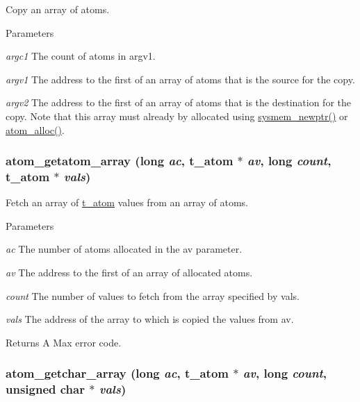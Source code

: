 Copy an array of atoms. 
\begin{DoxyParams}{Parameters}
\item[{\em argc1}]The count of atoms in argv1. \item[{\em argv1}]The address to the first of an array of atoms that is the source for the copy. \item[{\em argv2}]The address to the first of an array of atoms that is the destination for the copy. Note that this array must already by allocated using \hyperlink{group__memory_ga276676be214edff9fe5c9d0681f39ae6}{sysmem\_\-newptr()} or \hyperlink{group__atom_gad1a3b8eed4c311ec41b2d565bf40b002}{atom\_\-alloc()}. \end{DoxyParams}
\hypertarget{group__atom_ga76191e30761d55e4528b50e447f43abb}{
\subsubsection[{atom\_\-getatom\_\-array}]{ atom\_\-getatom\_\-array (long {\em ac}, \/  {\bf t\_\-atom} $\ast$ {\em av}, \/  long {\em count}, \/  {\bf t\_\-atom} $\ast$ {\em vals})}}
\label{group__atom_ga76191e30761d55e4528b50e447f43abb}


Fetch an array of \hyperlink{structt__atom}{t\_\-atom} values from an array of atoms. 
\begin{DoxyParams}{Parameters}
\item[{\em ac}]The number of atoms allocated in the av parameter. \item[{\em av}]The address to the first of an array of allocated atoms. \item[{\em count}]The number of values to fetch from the array specified by vals. \item[{\em vals}]The address of the array to which is copied the values from av. \end{DoxyParams}
\begin{DoxyReturn}{Returns}
A Max error code. 
\end{DoxyReturn}
\hypertarget{group__atom_ga76ec2c6ff61e5bb4e29e51f1a791db56}{
\subsubsection[{atom\_\-getchar\_\-array}]{ atom\_\-getchar\_\-array (long {\em ac}, \/  {\bf t\_\-atom} $\ast$ {\em av}, \/  long {\em count}, \/  unsigned char $\ast$ {\em vals})}}
\label{group__atom_ga76ec2c6ff61e5bb4e29e51f1a791db56}


